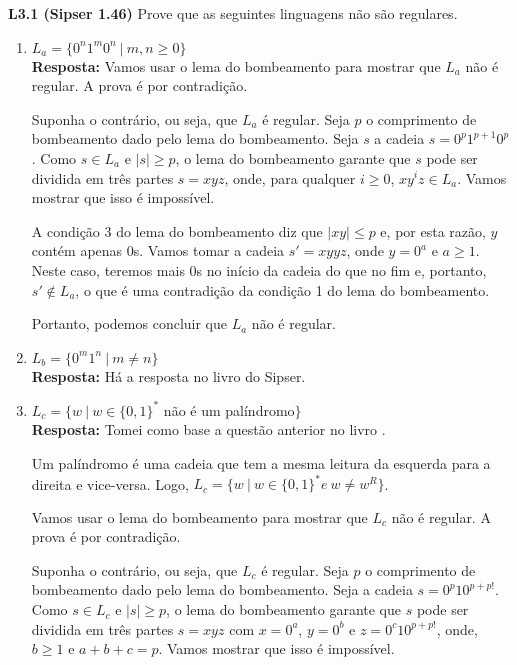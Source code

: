
\noindent \textbf{L3.1 (Sipser 1.46)} Prove que as seguintes linguagens não são regulares.
\begin{enumerate}[label={\textbf{\alph*.}}]
    \item $L_a = \{0^n1^m0^n \ |\ m, n \geq 0\}$\\[3pt]
    \textbf{Resposta:} Vamos usar o lema do bombeamento para mostrar que $L_a$ não é regular. A prova é por contradição.
    
    Suponha o contrário, ou seja, que $L_a$ é regular. Seja $p$ o comprimento de bombeamento dado pelo lema do bombeamento. Seja $s$ a cadeia $s = 0^p1^{p+1}0^p$. Como $s \in L_a$ e $|s| \geq p$, o lema do bombeamento garante que $s$ pode ser dividida em três partes $s = xyz$, onde, para qualquer $i \geq 0$, $xy^iz \in L_a$. Vamos mostrar que isso é impossível.
    
    A condição 3 do lema do bombeamento diz que $|xy| \leq p$ e, por esta razão, $y$ contém apenas 0s. Vamos tomar a cadeia $s' = xyyz$, onde $y = 0^a$ e $a \geq 1$. Neste caso, teremos mais 0s no início da cadeia do que no fim e, portanto, $s' \notin L_a$, o que é uma contradição da condição 1 do lema do bombeamento.
    
    Portanto, podemos concluir que $L_a$ não é regular.
    
    \item $L_b = \{0^m1^n \ |\ m \neq n\}$\\[3pt]
    \textbf{Resposta:} Há a resposta no livro do Sipser.
    
    \item $L_c = \{w \ |\ w \in \{0, 1\}^*$ não é um palíndromo$\}$\\[3pt]
    \textbf{Resposta:} Tomei como base a questão anterior no livro \cite{sipser:2006}.
    
    Um palíndromo é uma cadeia que tem a mesma leitura da esquerda para a direita e vice-versa. Logo, 
    $L_c = \{w \ |\ w \in \{0, 1\}^* e\ w \neq w^R\}$.
    
    Vamos usar o lema do bombeamento para mostrar que $L_c$ não é regular. A prova é por contradição.
    
    Suponha o contrário, ou seja, que $L_c$ é regular. Seja $p$ o comprimento de bombeamento dado pelo lema do bombeamento. Seja a cadeia $s = 0^p10^{p+p!}$. Como $s \in L_c$ e $|s| \geq p$, o lema do bombeamento garante que $s$ pode ser dividida em três partes $s = xyz$ com $x = 0^a$, $y = 0^b$ e $z = 0^c10^{p+p!}$, onde, $b \geq 1$ e $a + b + c = p$. Vamos mostrar que isso é impossível.
    

\end{enumerate}
